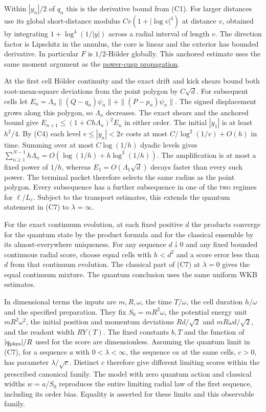 \documentclass[11pt,a4paper]{article}
\begin{document}
Within \(|y_n|/2\) of \(q_n\) this is the derivative bound from (C1).
For larger distances use its global short-distance modulus
\(Cv(1+|\log v|^4)\) at distance \(v\), obtained by integrating
\(1+\log^4(1/|y|)\) across a radial interval of length \(v\). The
direction factor is Lipschitz in the annulus, the core is linear and the
exterior has bounded derivative. In particular \(F\) is \(1/2\)-Hölder
globally. This anchored estimate uses the same moment argument as the
\href{cusp-quantum-preparation-selection.md}{power-cusp propagation}.

At the first cell Hölder continuity and the exact drift and kick shears
bound both root-mean-square deviations from the point polygon by
\(C\sqrt d\). For subsequent cells let
\(E_n=\Lambda_n\|(Q-q_n)\psi_n\|+\|(P-p_n)\psi_n\|\). The signed
displacement grows along this polygon, so \(\Lambda_n\) decreases. The
exact shears and the anchored bound give
\(E_{n+1}\le(1+C h\Lambda_n)^2 E_n\) in either order. The initial
\(|y_1|\) is at least \(h^2/4\). By (C4) each level \(v\le |y_n|<2v\)
costs at most \(C/\log^2(1/v)+O(h)\) in time. Summing over at most
\(C\log(1/h)\) dyadic levels gives \(\sum_{n\ge1}^{N-1}h\Lambda_n
=O(\log(1/h)+h\log^3(1/h))\). The amplification is at most a fixed power
of \(1/h\), whereas \(E_1=O(\Lambda_1\sqrt d)\) decays faster than every
such power. The terminal packet therefore selects the same radius as the
point polygon. Every subsequence has a further subsequence in one of the
two regimes for \(\ell/L_e\). Subject to the transport estimates, this
extends the quantum statement in (C7) to \(\lambda=\infty\).

For the exact continuum evolution, at each fixed positive \(d\) the
products converge for the quantum state by the product formula and for
the classical ensemble by its almost-everywhere uniqueness. For any
sequence \(d\downarrow0\) and any fixed bounded continuous radial score,
choose equal cells with \(h<d^2\) and a score error less than \(d\) from
that continuum evolution. The classical part of (C7) at \(\lambda=0\)
gives the equal continuum mixture. The quantum conclusion uses the same
uniform WKB estimates.

In dimensional terms the inputs are \(m,R,\omega\), the time
\(T/\omega\), the cell duration \(h/\omega\) and the specified
preparation. They fix \(S_0=mR^2\omega\), the potential energy unit
\(mR^2\omega^2\), the initial position and momentum deviations
\(Rd/\sqrt2\) and \(mR\omega d/\sqrt2\), and the readout width
\(R Y(T)\). The fixed constants \(b,T\) and the function of
\(|q_{\rm phys}|/R\) used for the score are dimensionless. Assuming the
quantum limit in (C7), for a sequence \(a\) with \(0<\lambda<\infty\),
the sequence \(c a\) at the same cells, \(c>0\), has parameter
\(\lambda/\sqrt c\). Distinct \(c\) therefore give different limiting
scores within the prescribed canonical family. The model with zero
quantum action and classical widths \(w=a/S_0\) reproduces the entire
limiting radial law of the first sequence, including its order bias.
Equality is asserted for these limits and this observable family.
\end{document}
